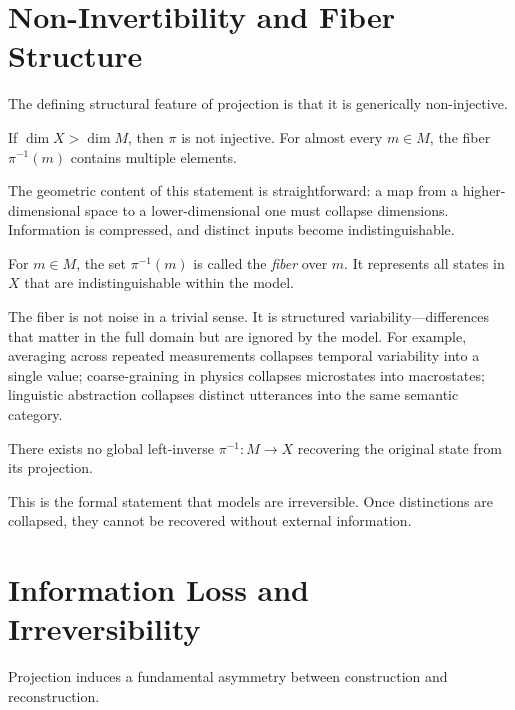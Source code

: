 \documentclass[11pt,openany]{book}
\begin{document}
\section{Non-Invertibility and Fiber Structure}
\label{sec:noninvertibility}

The defining structural feature of projection is that it is generically non-injective.

\begin{proposition}
If $\dim X > \dim M$, then $\pi$ is not injective. For almost every $m \in M$, the fiber $\pi^{-1}(m)$ contains multiple elements.
\end{proposition}

The geometric content of this statement is straightforward: a map from a higher-dimensional space to a lower-dimensional one must collapse dimensions. Information is compressed, and distinct inputs become indistinguishable.

\begin{definition}[Fiber]
For $m \in M$, the set $\pi^{-1}(m)$ is called the \emph{fiber} over $m$. It represents all states in $X$ that are indistinguishable within the model.
\end{definition}

The fiber is not noise in a trivial sense. It is structured variability—differences that matter in the full domain but are ignored by the model. For example, averaging across repeated measurements collapses temporal variability into a single value; coarse-graining in physics collapses microstates into macrostates; linguistic abstraction collapses distinct utterances into the same semantic category.

\begin{proposition}
\label{prop:noninvertible}
There exists no global left-inverse $\pi^{-1} : M \to X$ recovering the original state from its projection.
\end{proposition}

This is the formal statement that models are irreversible. Once distinctions are collapsed, they cannot be recovered without external information.

\section{Information Loss and Irreversibility}
\label{sec:information-loss}

Projection induces a fundamental asymmetry between construction and reconstruction.
\end{document}
